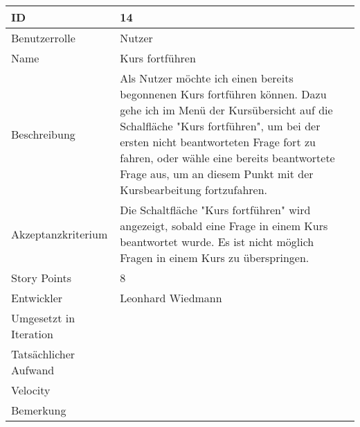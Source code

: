 \begin{tabularx}{\textwidth}{|p{}|X|}
	\hline
	ID & 14 \\
	\hline
	Benutzerrolle & Nutzer\\
	\hline
	Name & Kurs fortführen\\
	\hline
	Beschreibung & Als Nutzer möchte ich einen bereits begonnenen Kurs fortführen können. Dazu gehe ich im Menü der Kursübersicht auf die Schalfläche "Kurs fortführen", um bei der ersten nicht beantworteten Frage fort zu fahren, oder wähle eine bereits beantwortete Frage aus, um an diesem Punkt mit der Kursbearbeitung fortzufahren. \\
	\hline
	Akzeptanzkriterium & Die Schaltfläche "Kurs fortführen" wird angezeigt, sobald eine Frage in einem Kurs beantwortet wurde. Es ist nicht möglich Fragen in einem Kurs zu überspringen.\\
	\hline
	Story Points & 8\\
	\hline
	Entwickler & Leonhard Wiedmann\\
	\hline
	Umgesetzt in Iteration & \\ 
	\hline
	Tatsächlicher Aufwand & \\
	\hline
	Velocity & \\
	\hline
	Bemerkung & \\
	\hline
\end{tabularx}
\vspace{20pt}
